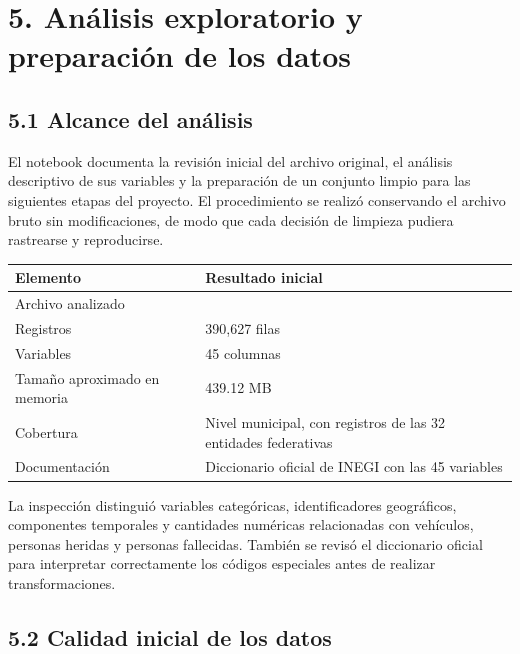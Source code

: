 \documentclass[11pt,letterpaper]{article}
\begin{document}
\newpage
\section*{5. Análisis exploratorio y preparación de los datos}

\subsection*{5.1 Alcance del análisis}

\begin{nota}
El notebook  documenta la revisión inicial del
archivo original, el análisis descriptivo de sus variables y la preparación de
un conjunto limpio para las siguientes etapas del proyecto. El procedimiento se
realizó conservando el archivo bruto sin modificaciones, de modo que cada
decisión de limpieza pudiera rastrearse y reproducirse.

\vspace{0.4em}
\begin{tabularx}{0.92\textwidth}{L{4.4cm}Y}
    \toprule
    \textbf{Elemento} & \textbf{Resultado inicial} \\
    \midrule
    Archivo analizado &  \\
    Registros & 390,627 filas \\
    Variables & 45 columnas \\
    Tamaño aproximado en memoria & 439.12 MB \\
    Cobertura & Nivel municipal, con registros de las 32 entidades federativas \\
    Documentación & Diccionario oficial de INEGI con las 45 variables \\
    \bottomrule
\end{tabularx}

\vspace{0.4em}
La inspección distinguió variables categóricas, identificadores geográficos,
componentes temporales y cantidades numéricas relacionadas con vehículos,
personas heridas y personas fallecidas. También se revisó el diccionario oficial
para interpretar correctamente los códigos especiales antes de realizar
transformaciones.
\end{nota}

\subsection*{5.2 Calidad inicial de los datos}
\end{document}
